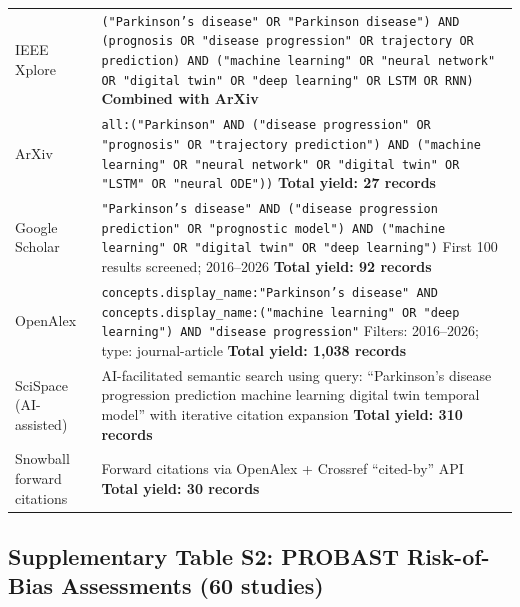\begin{longtable}{@{}p{2.6cm}p{12cm}@{}}
IEEE Xplore & \texttt{("Parkinson's disease" OR "Parkinson disease") AND (prognosis OR "disease progression" OR trajectory OR prediction) AND ("machine learning" OR "neural network" OR "digital twin" OR "deep learning" OR LSTM OR RNN)} \newline \textbf{Combined with ArXiv} \\
\addlinespace
ArXiv & \texttt{all:("Parkinson" AND ("disease progression" OR "prognosis" OR "trajectory prediction") AND ("machine learning" OR "neural network" OR "digital twin" OR "LSTM" OR "neural ODE"))} \newline \textbf{Total yield: 27 records} \\
\addlinespace
Google Scholar & \texttt{"Parkinson's disease" AND ("disease progression prediction" OR "prognostic model") AND ("machine learning" OR "digital twin" OR "deep learning")} \newline First 100 results screened; 2016--2026 \newline \textbf{Total yield: 92 records} \\
\addlinespace
OpenAlex & \texttt{concepts.display\_name:"Parkinson's disease" AND concepts.display\_name:("machine learning" OR "deep learning") AND "disease progression"} \newline Filters: 2016--2026; type: journal-article \newline \textbf{Total yield: 1{,}038 records} \\
\addlinespace
SciSpace (AI-assisted) & AI-facilitated semantic search using query: ``Parkinson's disease progression prediction machine learning digital twin temporal model'' with iterative citation expansion \newline \textbf{Total yield: 310 records} \\
\addlinespace
Snowball forward citations & Forward citations via OpenAlex + Crossref ``cited-by'' API \newline \textbf{Total yield: 30 records} \\
\end{longtable}
\normalsize

\subsection*{Supplementary Table S2: PROBAST Risk-of-Bias Assessments (60 studies)}
\label{sr:tab:supp:probast}

